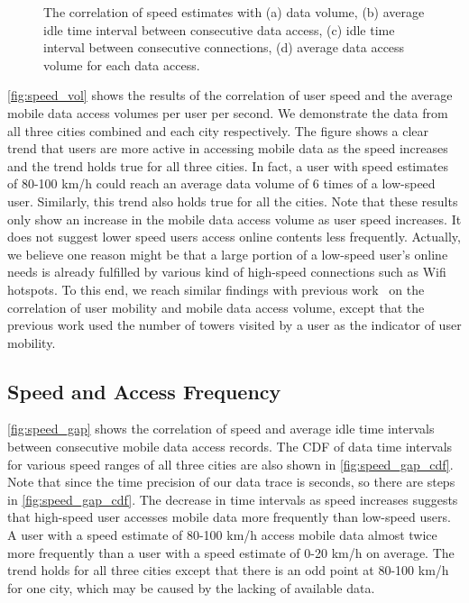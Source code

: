 \begin{figure}
    \caption{The correlation of speed estimates with (a) data volume, (b) average idle time interval between consecutive data access, (c) idle time interval between consecutive connections, (d) average data access volume for each data access.}
    \label{fig:speed_corr}
\end{figure}

\autoref{fig:speed_vol} shows the results of the correlation of user speed and the average mobile data access volumes per user per second. We demonstrate the data from all three cities combined and each city respectively. The figure shows a clear trend that users are more active in accessing mobile data as the speed increases and the trend holds true for all three cities. In fact, a user with speed estimates of 80-100 km/h could reach an average data volume of 6 times of a low-speed user. Similarly, this trend also holds true for all the cities. Note that these results only show an increase in the mobile data access volume as user speed increases. It does not suggest lower speed users access online contents less frequently. Actually, we believe one reason might be that a large portion of a low-speed user's online needs is already fulfilled by various kind of high-speed connections such as Wifi hotspots. To this end, we reach similar findings with previous work~\cite{yang2015characterizing} on the correlation of user mobility and mobile data access volume, except that the previous work used the number of towers visited by a user as the indicator of user mobility.

\subsection{Speed and Access Frequency}

\autoref{fig:speed_gap} shows the correlation of speed and average idle time intervals between consecutive mobile data access records. The CDF of data time intervals for various speed ranges of all three cities are also shown in \autoref{fig:speed_gap_cdf}. Note that since the time precision of our data trace is seconds, so there are steps in \autoref{fig:speed_gap_cdf}. The decrease in time intervals as speed increases suggests that high-speed user accesses mobile data more frequently than low-speed users. A user with a speed estimate of 80-100 km/h access mobile data almost twice more frequently than a user with a speed estimate of 0-20 km/h on average. The trend holds for all three cities except that there is an odd point at 80-100 km/h for one city, which may be caused by the lacking of available data.

